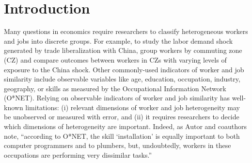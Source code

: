 \documentclass[12pt]{article}
\theoremstyle{definition}
\theoremstyle{plain}
\begin{document}


\clearpage

\onehalfspacing
\section{Introduction}

Many questions in economics require researchers to classify heterogeneous workers and jobs into discrete groups. For example, to study the labor demand shock generated by trade liberalization with China, \citet{AutorDornHanson2013} group workers by commuting zone (CZ) and compare outcomes between workers in CZs with varying levels of exposure to the China shock. Other commonly-used indicators of worker and job similarity include observable variables like age, education, occupation, industry, geography, or skills as measured by the Occupational Information Network (O*NET). Relying on observable indicators of worker and job similarity has well-known limitations: (i) relevant dimensions of worker and job heterogeneity may be unobserved or measured with error, and (ii) it requires researchers to decide which dimensions of heterogeneity are important. Indeed, as Autor and coauthors note, ``according to O*NET, the skill `installation' is equally important to both computer programmers and to plumbers, but, undoubtedly, workers in these occupations are performing very dissimilar tasks.''  \citep{FrankAutorBessenBrynjolfssonCebrianDemingFeldmanGrohLoboMoro2019}
\end{document}
